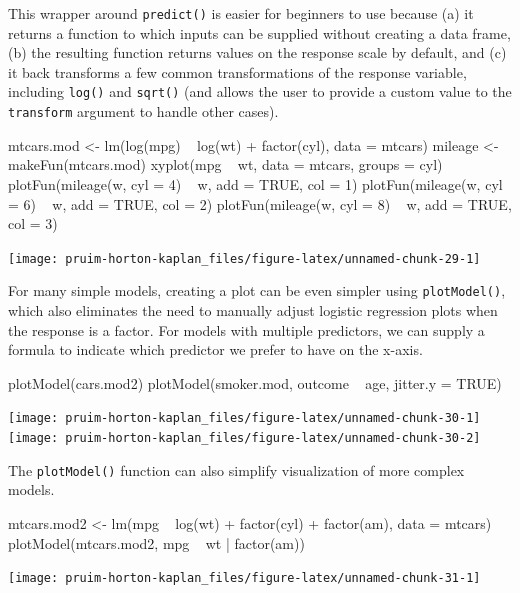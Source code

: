This wrapper around \texttt{predict()} is easier for beginners to use
because (a) it returns a function to which inputs can be supplied
without creating a data frame, (b) the resulting function returns values
on the response scale by default, and (c) it back transforms a few
common transformations of the response variable, including
\texttt{log()} and \texttt{sqrt()} (and allows the user to provide a
custom value to the \texttt{transform} argument to handle other cases).

\begin{Schunk}
\begin{Sinput}
mtcars.mod <- lm(log(mpg) ~ log(wt) + factor(cyl), data = mtcars)
mileage <- makeFun(mtcars.mod)
xyplot(mpg ~ wt, data = mtcars, groups = cyl)
plotFun(mileage(w, cyl = 4) ~ w, add = TRUE, col = 1)
plotFun(mileage(w, cyl = 6) ~ w, add = TRUE, col = 2)
plotFun(mileage(w, cyl = 8) ~ w, add = TRUE, col = 3)
\end{Sinput}


\begin{center}\texttt{[image: pruim-horton-kaplan\_files/figure-latex/unnamed-chunk-29-1]} \end{center}

\end{Schunk}

For many simple models, creating a plot can be even simpler using
\texttt{plotModel()}, which also eliminates the need to manually adjust
logistic regression plots when the response is a factor. For models with
multiple predictors, we can supply a formula to indicate which predictor
we prefer to have on the x-axis.

\begin{Schunk}
\begin{Sinput}
plotModel(cars.mod2)
plotModel(smoker.mod, outcome ~ age, jitter.y = TRUE)
\end{Sinput}


\begin{center}\texttt{[image: pruim-horton-kaplan\_files/figure-latex/unnamed-chunk-30-1]} \texttt{[image: pruim-horton-kaplan\_files/figure-latex/unnamed-chunk-30-2]} \end{center}

\end{Schunk}

\noindent
The \texttt{plotModel()} function can also simplify visualization of
more complex models.

\begin{Schunk}
\begin{Sinput}
mtcars.mod2 <- lm(mpg ~ log(wt) + factor(cyl) + factor(am), data = mtcars)
plotModel(mtcars.mod2, mpg ~ wt | factor(am))
\end{Sinput}


\begin{center}\texttt{[image: pruim-horton-kaplan\_files/figure-latex/unnamed-chunk-31-1]} \end{center}

\end{Schunk}

